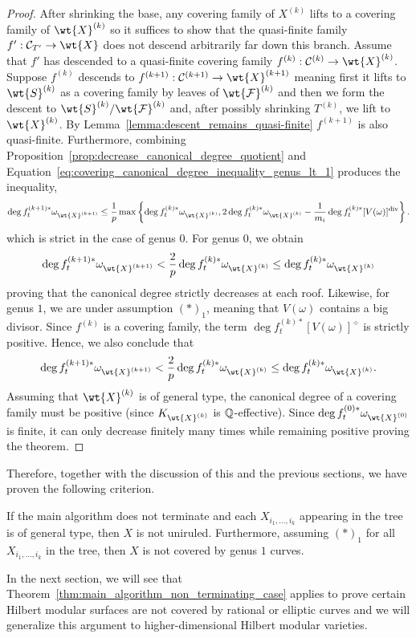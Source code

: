 \documentclass[main.tex]{subfiles}
\begin{document}
\begin{proof}
After shrinking the base, any covering family of $X^{(k)}$ lifts to a covering family of $\wt{X}^{(k)}$ so it suffices to show that the quasi-finite family $f' : \cC_{T'} \to \wt{X}$ does not descend arbitrarily far down this branch. 
Assume that $f'$ has descended to a quasi-finite covering family $f^{(k)} : \cC^{(k)} \to \wt{X}^{(k)}$. Suppose $f^{(k)}$ descends to $f^{(k+1)} : \cC^{(k+1)} \to \wt{X}^{(k+1)}$ meaning first it lifts to $\wt{S}^{(k)}$ as a covering family by leaves of $\wt{\F}^{(k)}$ and then we form the descent to $\wt{S}^{(k)} / \wt{\F}^{(k)}$ and, after possibly shrinking $T^{(k)}$, we lift to $\wt{X}^{(k)}$. By Lemma~\ref{lemma:descent_remains_quasi-finite} $f^{(k+1)}$ is also quasi-finite. Furthermore, combining Proposition~\ref{prop:decrease_canonical_degree_quotient} and Equation~\eqref{eq:covering_canonical_degree_inequality_genus_lt_1} produces the inequality,
\[ \deg{f^{(k+1)*}_t \omega_{\wt{X}^{(k+1)}}} \le \frac{1}{p} \max \left\{ \deg{f^{(k)*}_t \omega_{\wt{X}^{(k)}}},  2 \deg{f^{(k)*}_t \omega_{\wt{X}^{(k)}}} - \frac{1}{m_i} \deg{f_t^{(k)*} [V(\omega)]^{\div}} \right\}. \]
which is strict in the case of genus $0$. For genus $0$, we obtain
\[ \deg{f^{(k+1)*}_t \omega_{\wt{X}^{(k+1)}}} < \frac{2}{p} \deg{f^{(k)*}_t \omega_{\wt{X}^{(k)}}} \le \deg{f^{(k)*}_t \omega_{\wt{X}^{(k)}}} \]
proving that the canonical degree strictly decreases at each roof. Likewise, for genus $1$, we are under assumption $(\ast)_1$, meaning that $V(\omega)$ contains a big divisor. Since $f^{(k)}$ is a covering family, the term $\deg{f_t^{(k)*} [V(\omega)]^{\div}}$ is strictly positive. Hence, we also conclude that 
\[ \deg{f^{(k+1)*}_t \omega_{\wt{X}^{(k+1)}}} < \frac{2}{p} \deg{f^{(k)*}_t \omega_{\wt{X}^{(k)}}} \le \deg{f^{(k)*}_t \omega_{\wt{X}^{(k)}}}. \]
Assuming that $\wt{X}^{(k)}$ is of general type, the canonical degree of a covering family must be positive (since $K_{\wt{X}^{(k)}}$ is $\mathbb{Q}$-effective). Since $\deg{f_t^{(0)*} \omega_{\wt{X}^{(0)}}}$ is finite, it can only decrease finitely many times while remaining positive proving the theorem.
\end{proof}

Therefore, together with the discussion of this and the previous sections, we have proven the following criterion.

\begin{thm} \label{thm:main_algorithm_non_terminating_case}
If the main algorithm does not terminate and each $X_{i_1, \dots, i_k}$ appearing in the tree is of general type, then $X$ is not uniruled. Furthermore, assuming $(\ast)_1$ for all $X_{i_1, \dots, i_k}$ in the tree, then $X$ is not covered by genus $1$ curves.
\end{thm}

In the next section, we will see that Theorem~\ref{thm:main_algorithm_non_terminating_case} applies to prove certain Hilbert modular surfaces are not covered by rational or elliptic curves and we will generalize this argument to higher-dimensional Hilbert modular varieties. 

\ifSubfilesClassLoaded{%
  
  
}{}
\end{document}
